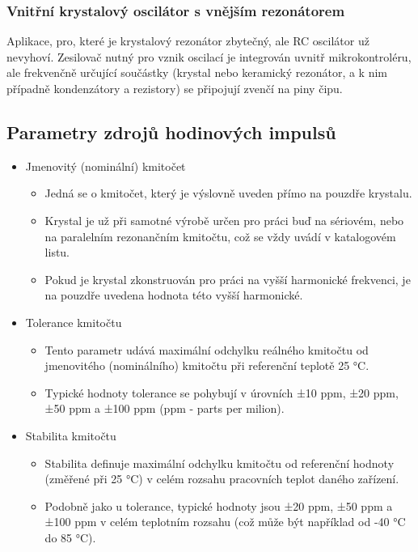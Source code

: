 \subsubsection{Vnitřní krystalový oscilátor s vnějším rezonátorem}
Aplikace, pro, které je krystalový rezonátor zbytečný, ale RC oscilátor už nevyhoví. Zesilovač nutný pro vznik oscilací je integrován uvnitř mikrokontroléru, ale frekvenčně určující součástky (krystal nebo keramický rezonátor, a k nim případně kondenzátory a rezistory) se připojují zvenčí na piny čipu.

\subsection{Parametry zdrojů hodinových impulsů}
\begin{itemize}
    \item Jmenovitý (nominální) kmitočet
    \begin{itemize}
        \item Jedná se o kmitočet, který je výslovně uveden přímo na pouzdře krystalu.
        \item Krystal je už při samotné výrobě určen pro práci buď na sériovém, nebo na paralelním rezonančním kmitočtu, což se vždy uvádí v katalogovém listu.
        \item Pokud je krystal zkonstruován pro práci na vyšší harmonické frekvenci, je na pouzdře uvedena hodnota této vyšší harmonické.
    \end{itemize}
    \item Tolerance kmitočtu
    \begin{itemize}
        \item Tento parametr udává maximální odchylku reálného kmitočtu od jmenovitého (nominálního) kmitočtu při referenční teplotě 25 °C.
        \item Typické hodnoty tolerance se pohybují v úrovních ±10 ppm, ±20 ppm, ±50 ppm a ±100 ppm (ppm - parts per milion).
    \end{itemize}
    \item Stabilita kmitočtu
    \begin{itemize}
        \item Stabilita definuje maximální odchylku kmitočtu od referenční hodnoty (změřené při 25 °C) v celém rozsahu pracovních teplot daného zařízení.
        \item Podobně jako u tolerance, typické hodnoty jsou ±20 ppm, ±50 ppm a ±100 ppm v celém teplotním rozsahu (což může být například od -40 °C do 85 °C).
    \end{itemize}

\end{itemize}
